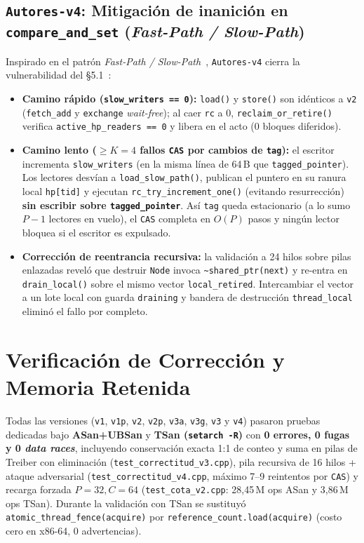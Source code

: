 \documentclass[10pt,twocolumn,a4paper]{article}
\begin{document}
\subsection{\texttt{Autores-v4}: Mitigación de inanición en \texttt{compare\_and\_set} (\emph{Fast-Path / Slow-Path})}
Inspirado en el patrón \emph{Fast-Path / Slow-Path}~\cite{kogan2012methodology,timnat2014simulation,nikolaev2024crystalline}, \texttt{Autores-v4} cierra la vulnerabilidad del \S 5.1~\cite{dewolff2024waitfree}:
\begin{itemize}
  \item \textbf{Camino rápido (\texttt{slow\_writers == 0}):} \texttt{load()} y \texttt{store()} son idénticos a \texttt{v2} (\texttt{fetch\_add} y \texttt{exchange} \emph{wait-free}); al caer \texttt{rc} a 0, \texttt{reclaim\_or\_retire()} verifica \texttt{active\_hp\_readers == 0} y libera en el acto (0 bloques diferidos).
  \item \textbf{Camino lento ($\ge K=4$ fallos \texttt{CAS} por cambios de \texttt{tag}):} el escritor incrementa \texttt{slow\_writers} (en la misma línea de 64\,B que \texttt{tagged\_pointer}). Los lectores desvían a \texttt{load\_slow\_path()}, publican el puntero en su ranura local \texttt{hp[tid]} y ejecutan \texttt{rc\_try\_increment\_one()} (evitando resurrección) \textbf{sin escribir sobre \texttt{tagged\_pointer}}. Así \texttt{tag} queda estacionario (a lo sumo $P-1$ lectores en vuelo), el \texttt{CAS} completa en $O(P)$ pasos y ningún lector bloquea si el escritor es expulsado.
  \item \textbf{Corrección de reentrancia recursiva:} la validación a 24 hilos sobre pilas enlazadas reveló que destruir \texttt{Node} invoca \texttt{\~{}shared\_ptr(next)} y re-entra en \texttt{drain\_local()} sobre el mismo vector \texttt{local\_retired}. Intercambiar el vector a un lote local con guarda \texttt{draining} y bandera de destrucción \texttt{thread\_local} eliminó el fallo por completo.
\end{itemize}

\section{Verificación de Corrección y Memoria Retenida}

Todas las versiones (\texttt{v1}, \texttt{v1p}, \texttt{v2}, \texttt{v2p}, \texttt{v3a}, \texttt{v3g}, \texttt{v3} y \texttt{v4}) pasaron pruebas dedicadas bajo \textbf{ASan+UBSan} y \textbf{TSan (\texttt{setarch -R})} con \textbf{0 errores, 0 fugas y 0 \emph{data races}}, incluyendo conservación exacta 1:1 de conteo y suma en pilas de Treiber con eliminación (\texttt{test\_correctitud\_v3.cpp}), pila recursiva de 16 hilos + ataque adversarial (\texttt{test\_correctitud\_v4.cpp}, máximo 7--9 reintentos por \texttt{CAS}) y recarga forzada $P=32, C=64$ (\texttt{test\_cota\_v2.cpp}: 28{,}45\,M ops ASan y 3{,}86\,M ops TSan). Durante la validación con TSan se sustituyó \texttt{atomic\_thread\_fence(acquire)} por \texttt{reference\_count.load(acquire)} (costo cero en x86-64, 0 advertencias).
\end{document}
